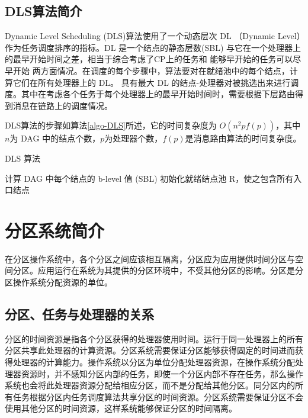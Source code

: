 \subsection{DLS算法简介}
\label{basic-DLS-intro}

Dynamic Level Scheduling (DLS)算法使用了一个动态层次 DL （Dynamic Level）作为任务调度排序的指标。DL 是一个结点的静态层数(SBL) 与它在一个处理器上的最早开始时间之差，相当于综合考虑了CP上的任务和 能够早开始的任务可以尽早开始 两方面情况。在调度的每个步骤中，算法要对在就绪池中的每个结点，计算它们在所有处理器上的 DL。 具有最大 DL 的结点-处理器对被挑选出来进行调度。其中在考虑各个任务于每个处理器上的最早开始时间时，需要根据下层路由得到消息在链路上的调度情况。

DLS算法的步骤如算法\ref{algo-DLS}所述，它的时间复杂度为 $O(n^{2}p f(p))$，其中$n$为 DAG 中的结点个数，$p$为处理器个数，$f(p)$是消息路由算法的时间复杂度。

\begin{algorithm}
\caption{DLS 算法}
\label{algo-DLS}
计算 DAG 中每个结点的 b-level 值 (SBL)\;
初始化就绪结点池 R，使之包含所有入口结点\;
\end{algorithm}


\section{分区系统简介}
\label{basic-partition}

在分区操作系统中，各个分区之间应该相互隔离，分区应为应用提供时间分区与空间分区。应用运行在系统为其提供的分区环境中，不受其他分区的影响。分区是分区操作系统分配资源的单位。

\subsection{分区、任务与处理器的关系}
分区的时间资源是指各个分区获得的处理器使用时间。运行于同一处理器上的所有分区共享此处理器的计算资源。分区系统需要保证分区能够获得固定的时间进而获得处理器的计算能力。操作系统以分区为单位分配处理器资源，在操作系统分配处理器资源时，并不感知分区内部的任务，即使一个分区内部不存在任务，那么操作系统也会将此处理器资源分配给相应分区，而不是分配给其他分区。同分区内的所有任务根据分区内任务调度算法共享分区的时间资源。分区系统需要保证分区不会使用其他分区的时间资源，这样系统能够保证分区的时间隔离。

